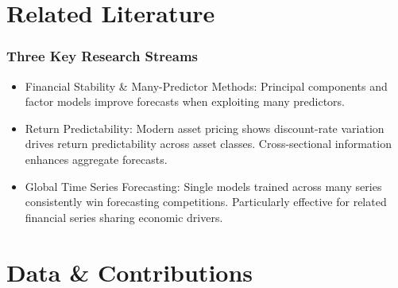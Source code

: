 \documentclass[ignorenonframetext, 9pt]{beamer}
\begin{document}
\section{Related Literature}

\begin{frame}
  \frametitle{Three Key Research Streams}
  \begin{itemize}
  \item \alert{Financial Stability \& Many-Predictor Methods:}
  Principal components and factor models improve forecasts when exploiting many predictors.
  \\ 
  \vspace{0.3cm}
  \item \alert{Return Predictability:}
  Modern asset pricing shows discount-rate variation drives return predictability across asset classes. Cross-sectional information enhances aggregate forecasts.
  \\ 
  \vspace{0.3cm}
  \item \alert{Global Time Series Forecasting:}
  Single models trained across many series consistently win forecasting competitions. Particularly effective for related financial series sharing economic drivers.
  \\ 
  \end{itemize}
\end{frame}

\section{Data \& Contributions}
\end{document}
